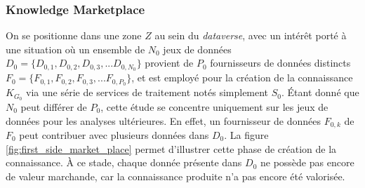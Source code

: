\subsubsection{Knowledge Marketplace} \label{subsubsec:kg_marketplace}

On se positionne dans une zone $Z$ au sein du \textit{dataverse}, avec un intérêt porté à une situation où un ensemble de $N_0$ jeux de données $D_0 = \{D_{0,1}, D_{0,2}, D_{0,3}, ... D_{0,N_0}\}$ provient de $P_0$ fournisseurs de données distincts $F_0 =\{F_{0,1}, F_{0,2}, F_{0,3}, ... F_{0,P_0}\}$, et est employé pour la création de la connaissance $K_{G_0}$ via une série de services de traitement notés simplement $S_0$. Étant donné que $N_0$ peut différer de $P_0$, cette étude se concentre uniquement sur les jeux de données pour les analyses ultérieures. En effet, un fournisseur de données $F_{0,k}$ de $F_0$ peut contribuer avec plusieurs données dans $D_0$. La figure \ref{fig:first_side_market_place} permet d'illustrer cette phase de création de la connaissance. À ce stade, chaque donnée présente dans $D_0 $ ne possède pas encore de valeur marchande, car la connaissance produite n'a pas encore été valorisée.

